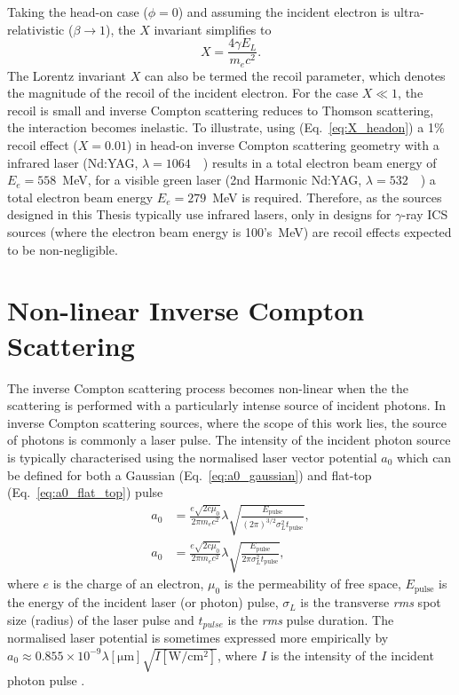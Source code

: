\documentclass[../main.tex]{subfiles}
\begin{document}
Taking the head-on case ($\phi = 0$) and assuming the incident electron is ultra-relativistic ($\beta \rightarrow 1$), the $X$ invariant simplifies to 
\begin{equation}
X = \frac{4\gamma E_{L}}{m_{e}c^{2}}.
\label{eq:X_headon}
\end{equation}
The Lorentz invariant $X$ can also be termed the recoil parameter, which denotes the magnitude of the recoil of the incident electron. For the case $X \ll 1$, the recoil is small and inverse Compton scattering reduces to Thomson scattering, the interaction becomes inelastic. To illustrate, using (Eq.~\ref{eq:X_headon}) a 1\% recoil effect ($X = 0.01$) in head-on inverse Compton scattering geometry with a infrared laser (Nd:YAG, $\lambda = 1064$~\si{\nano\metres}) results in a total electron beam energy of $E_{e} = 558$~\si{\mega\electronvolt}, for a visible green laser (2nd Harmonic Nd:YAG, $\lambda = 532$~\si{\nano\metres}) a total electron beam energy $E_{e} = 279$~\si{\mega\electronvolt} is required. Therefore, as the sources designed in this Thesis typically use infrared lasers, only in designs for $\gamma$-ray ICS sources (where the electron beam energy is 100's~\si{\mega\electronvolt}) are recoil effects expected to be non-negligible.     

\section{Non-linear Inverse Compton Scattering}

The inverse Compton scattering process becomes non-linear when the the scattering is performed with a particularly intense source of incident photons. In inverse Compton scattering sources, where the scope of this work lies, the source of photons is commonly a laser pulse. The intensity of the incident photon source is typically characterised using the normalised laser vector potential $a_{0}$ which can be defined for both a Gaussian (Eq.~\ref{eq:a0_gaussian}) and flat-top (Eq.~\ref{eq:a0_flat_top}) pulse \cite{terzic2019improving}
\begin{align}
a_{0} &= \frac{e\sqrt{2c\mu_{0}}}{2\pi m_{e}c^{2}}\lambda\sqrt{\frac{E_{\mathrm{pulse}}}{\left(2\pi\right)^{3/2}\sigma_{L}^{2}t_{\mathrm{pulse}}}},
\label{eq:a0_gaussian} \\
a_{0} &= \frac{e\sqrt{2c\mu_{0}}}{2\pi m_{e}c^{2}}\lambda\sqrt{\frac{E_{\mathrm{pulse}}}{2\pi\sigma_{L}^{2}t_{\mathrm{pulse}}}},
\label{eq:a0_flat_top}
\end{align}
where $e$ is the charge of an electron, $\mu_{0}$ is the permeability of free space, $E_{\mathrm{pulse}}$ is the energy of the incident laser (or photon) pulse, $\sigma_{L}$ is the transverse \textit{rms} spot size (radius) of the laser pulse and $t_{pulse}$ is the \textit{rms} pulse duration. The normalised laser potential is sometimes expressed more empirically by $a_{0} \approx 0.855\times 10^{-9} \lambda\left[\mathrm{\mu m}\right]\sqrt{I\left[\mathrm{W/cm^{2}}\right]}$, where $I$ is the intensity of the incident photon pulse \cite{li2004high}.
\end{document}
